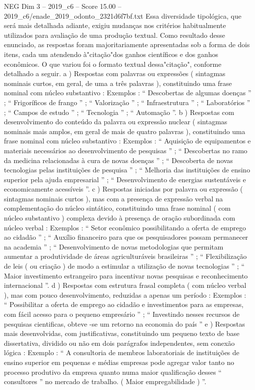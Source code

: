 \begin{textsample}{NEG Dim 3 – 2019\_c6 – Score 15.00 – 2019\_c6/enade\_2019\_odonto\_2321d6f7bf.txt}
Essa diversidade tipológica, que será mais detalhada adiante, exigiu mudanças nos critérios habitualmente utilizados para avaliação de uma produção textual.
Como resultado desse enunciado, as respostas foram majoritariamente apresentadas sob a forma de dois itens, cada um atendendo à"citação"dos ganhos científicos e dos ganhos econômicos.
O que variou foi o formato textual dessa"citação", conforme detalhado a seguir. a ) Respostas com palavras ou expressões ( sintagmas nominais curtos, em geral, de uma a três palavras ), constituindo uma frase nominal com núcleo substantivo : Exemplos : “ Descobertas de algumas doenças ” ; “ Frigoríficos de frango ” ; “ Valorização ” ; “ Infraestrutura ” ; “ Laboratórios ” ; “ Campos de estudo ” ; “ Tecnologia ” ; “ Automação ”. b ) Respostas com desenvolvimento do conteúdo da palavra ou expressão nuclear ( sintagmas nominais mais amplos, em geral de mais de quatro palavras ), constituindo uma frase nominal com núcleo substantivo : Exemplos : “ Aquisição de equipamentos e materiais necessários ao desenvolvimento de pesquisas ” ; “ Descobertas no ramo da medicina relacionadas à cura de novas doenças ” ; “ Descoberta de novas tecnologias pelas instituições de pesquisa ” ; “ Melhoria das instituições de ensino superior pela ajuda empresarial ” ; “ Desenvolvimento de energias sustentáveis e economicamente acessíveis ”. c ) Respostas iniciadas por palavra ou expressão ( sintagmas nominais curtos ), mas com a presença de expressão verbal na complementação do núcleo sintático, constituindo uma frase nominal ( com núcleo substantivo ) complexa devido à presença de oração subordinada com núcleo verbal : Exemplos : “ Setor econômico possibilitando a oferta de emprego ao cidadão ” ; “ Auxílio financeiro para que os pesquisadores possam permanecer na academia ” ; “ Desenvolvimento de novas metodologias que permitam aumentar a produtividade de áreas agriculturáveis brasileiras ” ; “ Flexibilização de leis ( ou criação ) de modo a estimular a utilização de novas tecnologias ” ; “ Maior investimento estrangeiro para incentivar novas pesquisas e reconhecimento internacional ”. d ) Respostas com estrutura frasal completa ( com núcleo verbal ), mas com pouco desenvolvimento, reduzidas a apenas um período : Exemplos : “ Possibilitar a oferta de emprego ao cidadão e investimentos para as empresas, com fácil acesso para o pequeno empresário ” ; “ Investindo nesses recursos de pesquisas cientificas, obteve -se um retorno na economia do país ” e ) Respostas mais desenvolvidas, com justificativas, constituindo um pequeno texto de base dissertativa, dividido ou não em dois parágrafos independentes, sem conexão lógica : Exemplo : “ A consultoria de membros laboratoriais de instituições de ensino superior em pequenas e médias empresas pode agregar valor tanto no processo produtivo da empresa quanto numa maior qualificação desses “ consultores ” no mercado de trabalho. ( Maior empregabilidade ) ”.

\end{textsample}
